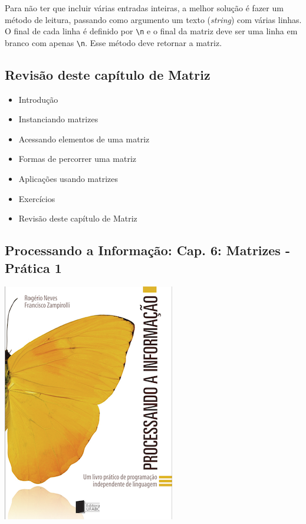 \documentclass[12pt,a4paper]{article}
\providecommand{\tightlist}{%
      \setlength{\itemsep}{0pt}\setlength{\parskip}{0pt}}
\begin{document}
Para não ter que incluir várias entradas inteiras, a melhor solução é
fazer um método de leitura, passando como argumento um texto
(\emph{string}) com várias linhas. O final de cada linha é definido por
\texttt{\textbackslash{}n} e o final da matriz deve ser uma linha em
branco com apenas \texttt{\textbackslash{}n}. Esse método deve retornar
a matriz.

    \hypertarget{revisuxe3o-deste-capuxedtulo-de-matriz}{%
\subsection{Revisão deste capítulo de
Matriz}\label{revisuxe3o-deste-capuxedtulo-de-matriz}}

\begin{itemize}
\tightlist
\item
  Introdução
\item
  Instanciando matrizes
\item
  Acessando elementos de uma matriz
\item
  Formas de percorrer uma matriz
\item
  Aplicações usando matrizes
\item
  Exercícios
\item
  Revisão deste capítulo de Matriz
\end{itemize}

    \hypertarget{processando-a-informauxe7uxe3o-cap.-6-matrizes---pruxe1tica-1}{%
\subsection{Processando a Informação: Cap. 6: Matrizes - Prática
1}\label{processando-a-informauxe7uxe3o-cap.-6-matrizes---pruxe1tica-1}}

    \includegraphics{"figs/Capa_Processando_Informacao.jpg"}
\end{document}
